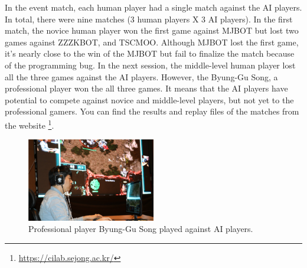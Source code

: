 In the event match, each human player had a single match against the AI players. In total, there were nine matches (3 human players X 3 AI players). In the first match, the novice human player won the first game against MJBOT but lost two games against ZZZKBOT, and TSCMOO. Although MJBOT lost the first game, it's nearly close to the win of the MJBOT but fail to finalize the match because of the programming bug. In the next session, the middle-level human player lost all the three games against the AI players. However, the Byung-Gu Song, a professional player won the all three games. It means that the AI players have potential to compete against novice and middle-level players, but not yet to the professional gamers. You can find the results and replay files of the matches from the website \footnote{\url{https://cilab.sejong.ac.kr/}}. 

\begin{figure}[h]
  \centering
  \includegraphics[width=0.5\textwidth]{fig/song_human_ai.png}
  \caption{Professional player Byung-Gu Song played against AI players.}
  \label{figureSong}
\end{figure} 
